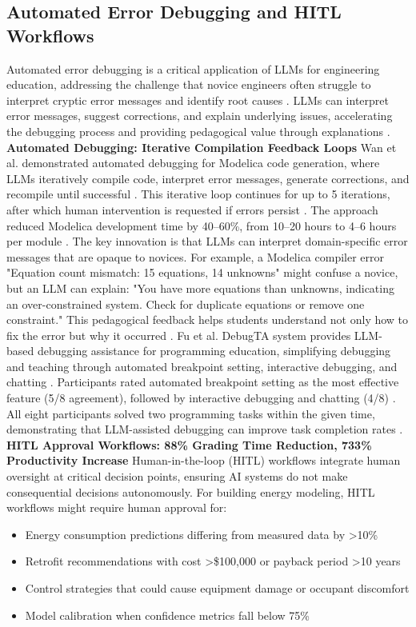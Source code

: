 \documentclass[12pt,a4paper]{article}
\begin{document}
\subsection{Automated Error Debugging and HITL Workflows}
Automated error debugging is a critical application of LLMs for engineering education, addressing the challenge that novice engineers often struggle to interpret cryptic error messages and identify root causes \cite{ref12}. LLMs can interpret error messages, suggest corrections, and explain underlying issues, accelerating the debugging process and providing pedagogical value through explanations \cite{ref61}.
\textbf{Automated Debugging: Iterative Compilation Feedback Loops}
Wan et al. demonstrated automated debugging for Modelica code generation, where LLMs iteratively compile code, interpret error messages, generate corrections, and recompile until successful \cite{ref61}. This iterative loop continues for up to 5 iterations, after which human intervention is requested if errors persist \cite{ref61}. The approach reduced Modelica development time by 40--60\%, from 10--20 hours to 4--6 hours per module \cite{ref61}.
The key innovation is that LLMs can interpret domain-specific error messages that are opaque to novices. For example, a Modelica compiler error "Equation count mismatch: 15 equations, 14 unknowns" might confuse a novice, but an LLM can explain: "You have more equations than unknowns, indicating an over-constrained system. Check for duplicate equations or remove one constraint." \cite{ref61} This pedagogical feedback helps students understand not only how to fix the error but why it occurred \cite{ref61}.
Fu et al. DebugTA system provides LLM-based debugging assistance for programming education, simplifying debugging and teaching through automated breakpoint setting, interactive debugging, and chatting \cite{ref12}. Participants rated automated breakpoint setting as the most effective feature (5/8 agreement), followed by interactive debugging and chatting (4/8) \cite{ref12}. All eight participants solved two programming tasks within the given time, demonstrating that LLM-assisted debugging can improve task completion rates \cite{ref12}.
\textbf{HITL Approval Workflows: 88\% Grading Time Reduction, 733\% Productivity Increase}
Human-in-the-loop (HITL) workflows integrate human oversight at critical decision points, ensuring AI systems do not make consequential decisions autonomously. For building energy modeling, HITL workflows might require human approval for:
\begin{itemize}
  \item Energy consumption predictions differing from measured data by >10\%
  \item Retrofit recommendations with cost >\$100,000 or payback period >10 years
  \item Control strategies that could cause equipment damage or occupant discomfort
  \item Model calibration when confidence metrics fall below 75\%
\end{itemize}
\end{document}
